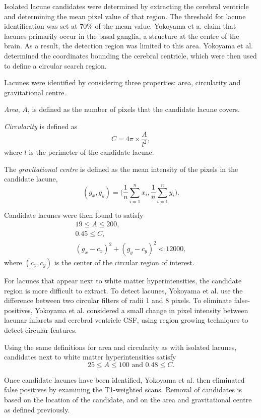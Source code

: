 Isolated lacune candidates were determined by extracting the cerebral ventricle and determining the mean pixel value of that region. The threshold for lacune identification was set at 70\% of the mean value. Yokoyama et a. claim that lacunes primarily occur in the basal ganglia, a structure at the centre of the brain. As a result, the detection region was limited to this area. Yokoyama et al. determined the coordinates bounding the cerebral centricle, which were then used to define a circular search region.

Lacunes were identified by considering three properties: area, circularity and gravitational centre.

\textit{Area}, $A$, is defined as the number of pixels that the candidate lacune covers. 

\textit{Circularity} is defined as
\[
	C = 4\pi \times \dfrac{A}{l^2},
\]
where $l$ is the perimeter of the candidate lacune.

The \textit{gravitational centre} is defined as the mean intensity of the pixels in the candidate lacune,
\[
	(g_x, g_y) = \bigg(\dfrac{1}{n}\sum_{i=1}^nx_i, \dfrac{1}{n}\sum_{i=1}^ny_i\bigg).
\]


Candidate lacunes were then found to satisfy
\begin{align*}
	19 \le A \le 200, \\
	0.45 \le C, \\
	(g_x - c_x)^2 + (g_y - c_y)^2 < 12000,
\end{align*}
where $(c_x, c_y)$ is the center of the circular region of interest.

For lacunes that appear next to white matter hyperintensities, the candidate region is more difficult to extract. To detect lacunes, Yokoyama et al. use the difference between two circular filters of radii 1 and 8 pixels. To eliminate false-positives, Yokoyama et al. considered a small change in pixel intensity between lacunar infarcts and cerebral ventricle CSF, using region growing techniques to detect circular features.

Using the same definitions for area and circularity as with isolated lacunes, candidates next to white matter hyperintensities satisfy
\[
	25 \le A \le 100\text{ and } 0.48 \le C.
\]

Once candidate lacunes have been identified, Yokoyama et al. then eliminated false positives by examining the T1-weighted scans. Removal of candidates is based on the location of the candidate, and on the area and gravitational centre as defined previously.

